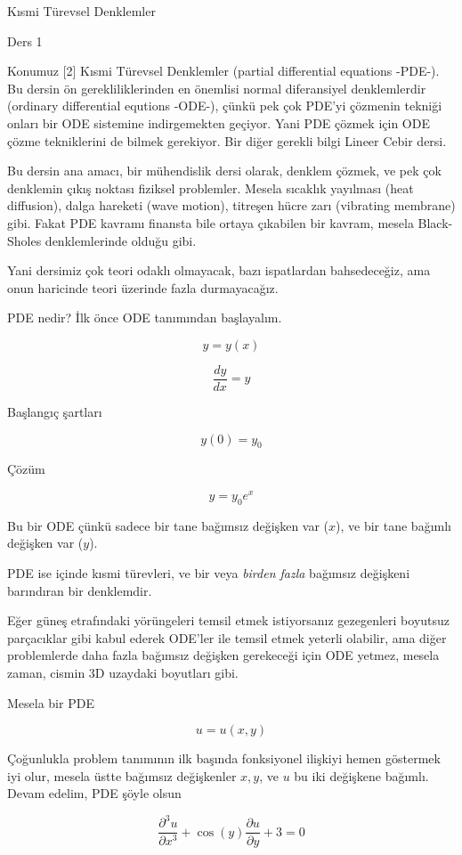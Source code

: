 \documentclass[12pt,fleqn]{article}\usepackage{../../common}
\begin{document}
Kısmi Türevsel Denklemler

Ders 1

Konumuz [2] Kısmi Türevsel Denklemler (partial differential equations -PDE-). Bu
dersin ön gerekliliklerinden en önemlisi normal diferansiyel denklemlerdir
(ordinary differential equtions -ODE-), çünkü pek çok PDE'yi çözmenin tekniği
onları bir ODE sistemine indirgemekten geçiyor. Yani PDE çözmek için ODE çözme
tekniklerini de bilmek gerekiyor. Bir diğer gerekli bilgi Lineer Cebir dersi.

Bu dersin ana amacı, bir mühendislik dersi olarak, denklem çözmek, ve pek
çok denklemin çıkış noktası fiziksel problemler. Mesela sıcaklık yayılması
(heat diffusion), dalga hareketi (wave motion), titreşen hücre zarı
(vibrating membrane) gibi. Fakat PDE kavramı finansta bile ortaya çıkabilen
bir kavram, mesela Black-Sholes denklemlerinde olduğu gibi. 

Yani dersimiz çok teori odaklı olmayacak, bazı ispatlardan bahsedeceğiz,
ama onun haricinde teori üzerinde fazla durmayacağız. 

PDE nedir? İlk önce ODE tanımından başlayalım. 

$$ y = y(x) $$

$$ \frac{dy}{dx} = y $$

Başlangıç şartları

$$ y(0) = y_0 $$

Çözüm 

$$ y = y_0e^x $$

Bu bir ODE çünkü sadece bir tane bağımsız değişken var ($x$), ve bir tane
bağımlı değişken var ($y$). 

PDE ise içinde kısmi türevleri, ve bir veya {\em birden fazla} bağımsız
değişkeni barındıran bir denklemdir.

Eğer güneş etrafındaki yörüngeleri temsil etmek istiyorsanız gezegenleri
boyutsuz parçacıklar gibi kabul ederek ODE'ler ile temsil etmek yeterli
olabilir, ama diğer problemlerde daha fazla bağımsız değişken gerekeceği
için ODE yetmez, mesela zaman, cismin 3D uzaydaki boyutları gibi.

Mesela bir PDE

$$ u = u(x,y) $$

Çoğunlukla problem tanımının ilk başında fonksiyonel ilişkiyi hemen
göstermek iyi olur, mesela üstte bağımsız değişkenler $x,y$, ve $u$ bu iki
değişkene bağımlı. Devam edelim, PDE şöyle olsun

$$ \frac{\partial^3 u}{\partial x^3} + 
\cos(y)\frac{\partial u}{\partial y} + 3 = 0
$$
\end{document}
